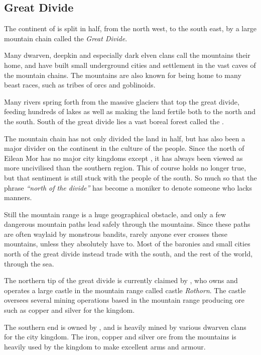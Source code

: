 \subsection{Great Divide}
\label{sec:Great Divide}

The continent of  is split in half, from the north west,
to the south east, by a large mountain chain called the \emph{Great Divide}.

Many dwarven, deepkin and especially dark elven clans call the mountains their
home, and have built small underground cities and settlement in the vast caves
of the mountain chains. The mountains are also known for being home to many
beast races, such as tribes of orcs and goblinoids.

Many rivers spring forth from the massive glaciers that top the great divide,
feeding hundreds of lakes as well as making the land fertile both to the north
and the south. South of the great divide lies a vast boreal forest called the
.

The mountain chain has not only divided the land in half, but has also been
a major divider on the continent in the culture of the people. Since the north
of Eilean Mor has no major city kingdoms except , it has
always been viewed as more uncivilised than the southern region. This of
course holds no longer true, but that sentiment is still stuck with the people
of the south. So much so that the phrase \emph{``north of the divide''} has
become a moniker to denote someone who lacks manners.

Still the mountain range is a huge geographical obstacle, and only a few
dangerous mountain paths lead safely through the mountains. Since these paths
are often waylaid by monstrous bandits, rarely anyone ever crosses these
mountains, unless they absolutely have to. Most of the baronies and small
cities north of the great divide instead trade with the south, and the rest
of the world, through the sea.

The northern tip of the great divide is currently claimed by
, who owns and operates a large castle in the mountain
range called castle \emph{Rothorn}. The castle oversees several mining
operations based in the mountain range producing ore such as copper and silver
for the kingdom.

The southern end is owned by , and is heavily mined by
various dwarven clans for the city kingdom. The iron, copper and silver ore
from the mountains is heavily used by the kingdom to make excellent arms and
armour.
